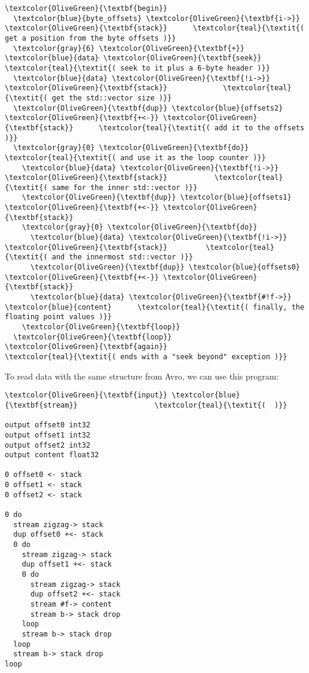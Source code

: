 \documentclass{webofc}
\begin{document}
\begin{Verbatim}[commandchars=\\\{\}]
\textcolor{OliveGreen}{\textbf{begin}}
  \textcolor{blue}{byte_offsets} \textcolor{OliveGreen}{\textbf{i->}} \textcolor{OliveGreen}{\textbf{stack}}      \textcolor{teal}{\textit{( get a position from the byte offsets )}}
  \textcolor{gray}{6} \textcolor{OliveGreen}{\textbf{+}} \textcolor{blue}{data} \textcolor{OliveGreen}{\textbf{seek}}               \textcolor{teal}{\textit{( seek to it plus a 6-byte header )}}
  \textcolor{blue}{data} \textcolor{OliveGreen}{\textbf{!i->}} \textcolor{OliveGreen}{\textbf{stack}}             \textcolor{teal}{\textit{( get the std::vector size )}}
  \textcolor{OliveGreen}{\textbf{dup}} \textcolor{blue}{offsets2} \textcolor{OliveGreen}{\textbf{+<-}} \textcolor{OliveGreen}{\textbf{stack}}      \textcolor{teal}{\textit{( add it to the offsets )}}
  \textcolor{gray}{0} \textcolor{OliveGreen}{\textbf{do}}                        \textcolor{teal}{\textit{( and use it as the loop counter )}}
    \textcolor{blue}{data} \textcolor{OliveGreen}{\textbf{!i->}} \textcolor{OliveGreen}{\textbf{stack}}           \textcolor{teal}{\textit{( same for the inner std::vector )}}
    \textcolor{OliveGreen}{\textbf{dup}} \textcolor{blue}{offsets1} \textcolor{OliveGreen}{\textbf{+<-}} \textcolor{OliveGreen}{\textbf{stack}}
    \textcolor{gray}{0} \textcolor{OliveGreen}{\textbf{do}}
      \textcolor{blue}{data} \textcolor{OliveGreen}{\textbf{!i->}} \textcolor{OliveGreen}{\textbf{stack}}         \textcolor{teal}{\textit{( and the innermost std::vector )}}
      \textcolor{OliveGreen}{\textbf{dup}} \textcolor{blue}{offsets0} \textcolor{OliveGreen}{\textbf{+<-}} \textcolor{OliveGreen}{\textbf{stack}}
      \textcolor{blue}{data} \textcolor{OliveGreen}{\textbf{#!f->}} \textcolor{blue}{content}      \textcolor{teal}{\textit{( finally, the floating point values )}}
    \textcolor{OliveGreen}{\textbf{loop}}
  \textcolor{OliveGreen}{\textbf{loop}}
\textcolor{OliveGreen}{\textbf{again}}                         \textcolor{teal}{\textit{( ends with a "seek beyond" exception )}}
\end{Verbatim}

\noindent To read data with the same structure from Avro, we can use this program:

\begin{Verbatim}[commandchars=\\\{\}]
\textcolor{OliveGreen}{\textbf{input}} \textcolor{blue}{\textbf{stream}}                  \textcolor{teal}{\textit{(  )}}

output offset0 int32
output offset1 int32
output offset2 int32
output content float32

0 offset0 <- stack
0 offset1 <- stack
0 offset2 <- stack

0 do
  stream zigzag-> stack
  dup offset0 +<- stack
  0 do
    stream zigzag-> stack
    dup offset1 +<- stack
    0 do
      stream zigzag-> stack
      dup offset2 +<- stack
      stream #f-> content
      stream b-> stack drop
    loop
    stream b-> stack drop
  loop
  stream b-> stack drop
loop
\end{Verbatim}
\end{document}
